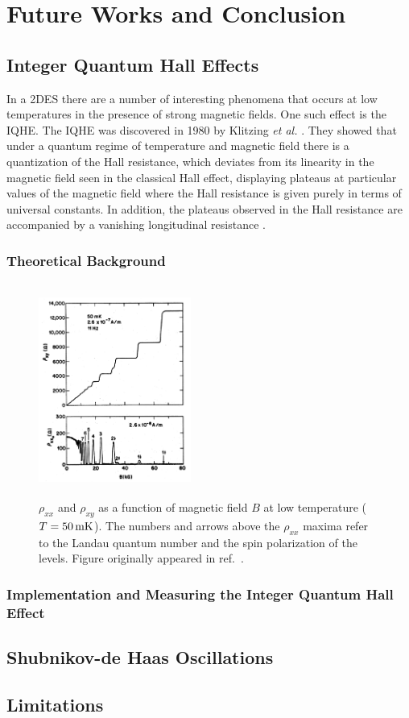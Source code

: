 \chapter{Future Works and Conclusion}\label{chap:conclusion}
\section{Integer Quantum Hall Effects}\label{sec:IQHE}
In a \ac{2DES} there are a number of interesting phenomena that occurs at low temperatures in the presence of strong magnetic fields. One such effect is the \ac{IQHE}. The \acs{IQHE} was discovered in 1980 by Klitzing \emph{et al.} \cite{Klitzing_PhysRevLett1980}. They showed that under a quantum regime of temperature and magnetic field there is a quantization of the Hall resistance, which deviates from its linearity in the magnetic field seen in the classical Hall effect, displaying plateaus at particular values of the magnetic field where the Hall resistance is given purely in terms of universal constants. In addition, the plateaus observed in the Hall resistance are accompanied by a vanishing longitudinal resistance \cite{Klitzing_PhysRevLett1980,Ando_RevModPhys1982,Goerbig_2009,Hook_Solid1991}.

\subsection{Theoretical Background}\label{subsec:IQHE_theory}
\begin{figure}[ht]
	\centering
	\includegraphics[height=7cm,width=5cm]{figs/future/IQHE_data_RHOxy_RHOxx}
	\caption[Example data of the Integer Quantum Hall Effect]{$\rho_{xx}$ and $\rho_{xy}$ as a function of magnetic field $B$ at low temperature ($T=50\,\mathrm{mK}$). The numbers and arrows above the $\rho_{xx}$ maxima refer to the Landau quantum number and the spin polarization of the levels. Figure originally appeared in ref.~\cite{Paalanen_PhysRevB1982}.}
	\label{fig:IQHE_data}
\end{figure}

\subsection{Implementation and Measuring the Integer Quantum Hall Effect}\label{subsec:IQHE_measure}

\section{Shubnikov-de Haas Oscillations}\label{sec:sdh_oscillations}

\section{Limitations}\label{sec:limitations}